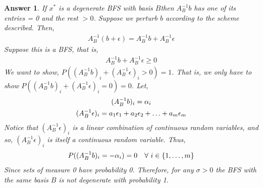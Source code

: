 \documentclass[12pt]{article}
\theoremstyle{colon}
\newtheorem*{answer}{Answer}
\begin{document}
\begin{answer}
  If $x^*$ is a degenerate BFS with basis $B $then $A^{-1}_B b$ has one of its entries = 0 and the rest $> 0$. Suppose we perturb $b$ according to the scheme described. Then,
  \begin{gather*}
    A^{-1}_B (b + \epsilon) = A^{-1}_B b + A^{-1}_B \epsilon
  \end{gather*}
  Suppose this is a BFS, that is,
  \begin{gather*}
    A^{-1}_B b + A^{-1}_B \epsilon \geq 0
  \end{gather*}
  We want to show, $P((A^{-1}_B b)_i + (A^{-1}_B \epsilon)_i > 0) = 1$. That is, we only have to show $P((A^{-1}_B b)_i + (A^{-1}_B \epsilon)_i = 0) = 0$. Let,
  \begin{gather*}
    (A^{-1}_B b)_i = \alpha_i \\
    (A^{-1}_B \epsilon)_i = a_1 \epsilon_1 + a_2 \epsilon_2 + \mathellipsis + a_m \epsilon_m
  \end{gather*}
  Notice that $(A^{-1}_B \epsilon)_i$ is a linear combination of continuous random variables, and so, $(A^{-1}_B \epsilon)_i$ is itself a continuous random variable. Thus,
  \begin{gather*}
    P((A^{-1}_B b)_i = -\alpha_i) = 0 \quad \forall \ i \in \{ 1, \mathellipsis, m\}
  \end{gather*}
  Since sets of measure 0 have probability 0. Therefore, for any $\sigma > 0$ the BFS with the same basis $B$ is not degenerate with probability 1.
\end{answer}
\end{document}
